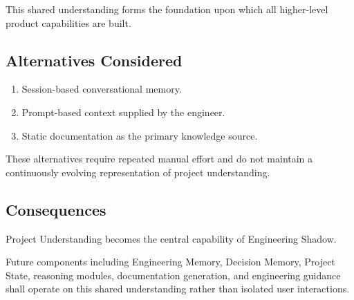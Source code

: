 This shared understanding forms the foundation upon which all higher-level product capabilities are built.

\subsection*{Alternatives Considered}

\begin{enumerate}
    \item Session-based conversational memory.
    \item Prompt-based context supplied by the engineer.
    \item Static documentation as the primary knowledge source.
\end{enumerate}

These alternatives require repeated manual effort and do not maintain a continuously evolving representation of project understanding.

\subsection*{Consequences}

Project Understanding becomes the central capability of Engineering Shadow.

Future components including Engineering Memory, Decision Memory, Project State, reasoning modules, documentation generation, and engineering guidance shall operate on this shared understanding rather than isolated user interactions.